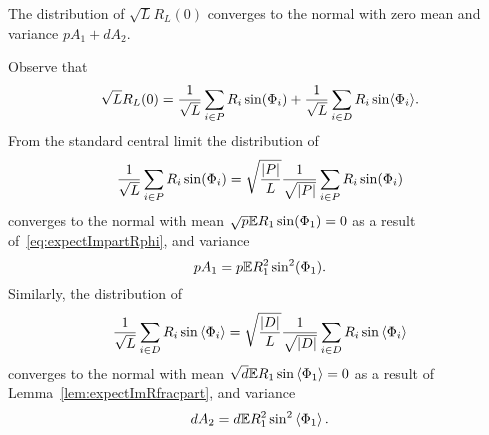 \documentclass[journal]{IEEEtran}
\begin{document}
\begin{lemma}\label{lem:convdistGLdash}
The distribution of $\sqrt{L}R_L(0)$ converges to the normal with zero mean and variance $pA_1 + dA_2$.
\end{lemma}
\begin{IEEEproof}
Observe that 
\[
\sqrt{L} R_L(0) = \frac{1}{\sqrt{L}} \sum_{i \in P} R_i \sin(\Phi_i) + \frac{1}{\sqrt{L}} \sum_{i \in D} R_i \sin\langle \Phi_i \rangle.
\]
From the standard central limit the distribution of
\[
\frac{1}{\sqrt{L}} \sum_{i \in P} R_i \sin(\Phi_i) = \sqrt{\frac{{\vert P \vert}}{L}} \frac{1}{\sqrt{{\vert P \vert}}} \sum_{i \in P} R_i \sin(\Phi_i) 
\]
converges to the normal with mean $\sqrt{p}{\mathbb E} R_1 \sin(\Phi_1) = 0$ as a result of~\eqref{eq:expectImpartRphi}, and variance
\[
p A_1 = p {\mathbb E} R_1^2 \sin^2(\Phi_1).
\]
Similarly, the distribution of 
\[ 
\frac{1}{\sqrt{L}} \sum_{i \in D} R_i \sin\left\langle \Phi_i \right\rangle = \sqrt{\frac{{\vert D \vert}}{L}} \frac{1}{\sqrt{{\vert D \vert}}} \sum_{i \in D} R_i \sin\left\langle \Phi_i \right\rangle 
\]
converges to the normal with mean $\sqrt{d}{\mathbb E} R_1 \sin\left\langle \Phi_1 \right\rangle = 0$ as a result of Lemma~\ref{lem:expectImRfracpart}, and variance
\[
d A_2 = d {\mathbb E} R_1^2 \sin^2\left\langle \Phi_1 \right\rangle.
\]
\end{IEEEproof}
\end{document}
